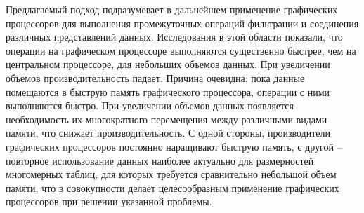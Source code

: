\documentclass[10pt,a4paper]{article}
\begin{document}
Предлагаемый подход подразумевает в дальнейшем применение графических процессоров
для выполнения промежуточных операций фильтрации и соединения различных представлений данных.
Исследования в этой области показали, что операции на графическом процессоре выполняются
существенно быстрее, чем на центральном процессоре, для небольших объемов данных. При увеличении
объемов производительность падает. Причина очевидна: пока данные помещаются в быструю память
графического процессора, операции с ними выполняются быстро. При увеличении объемов данных появляется
необходимость их многократного перемещения между различными видами памяти, что снижает
производительность. С одной стороны, производители графических процессоров постоянно наращивают
быструю память, с другой – повторное использование данных наиболее актуально для размерностей
многомерных таблиц, для которых требуется сравнительно небольшой объем памяти, что в совокупности
делает целесообразным применение графических процессоров при решении указанной проблемы.



\end{document}
